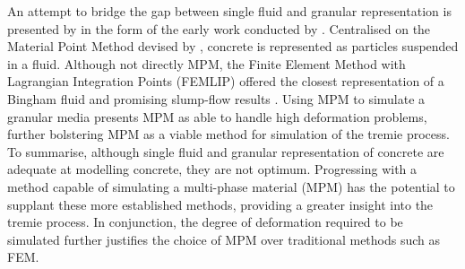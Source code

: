 \newline
\noindent
An attempt to bridge the gap between single fluid and granular representation is presented by \citet{roussel07} in the form of the early work conducted by \citet{moresi03}. Centralised on the Material Point Method devised by \citet{sulsky94}, concrete is represented as particles suspended in a fluid. Although not directly MPM, the Finite Element Method with Lagrangian Integration Points (FEMLIP) offered the closest representation of a Bingham fluid \citep{sofcf} and promising slump-flow results \citep{moresi03,dufour05}. Using MPM to simulate a granular media \citet{Krishna} presents MPM as able to handle high deformation problems, further bolstering MPM as a viable method for simulation of the tremie process.\\
\newline
\noindent
To summarise, although single fluid and granular representation of concrete are adequate at modelling concrete, they are not optimum. Progressing with a method capable of simulating a multi-phase material (MPM) has the potential to supplant these more established methods, providing a greater insight into the tremie process. In conjunction, the degree of deformation required to be simulated further justifies the choice of MPM over traditional methods such as FEM.
